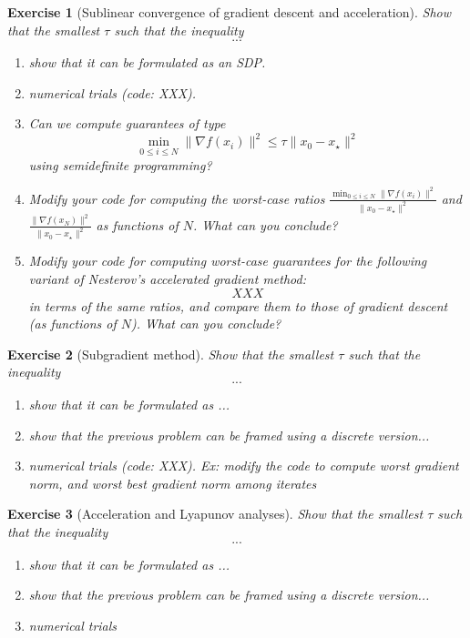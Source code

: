 \documentclass[11pt,a4paper]{article}
\newtheorem{exercise}{Exercise}
\begin{document}
	\begin{exercise}[Sublinear convergence of gradient descent and acceleration]
	Show that the smallest $\tau$ such that the inequality
	\[ ... \]
	\begin{enumerate}
	\item show that it can be formulated as an SDP.
	\item numerical trials (code: XXX).
	\item Can we compute guarantees of type 
	\[ \min_{0\leqslant i\leqslant N} \|\nabla f(x_i)\|^2\leqslant \tau \|x_0-x_\star\|^2\]
	using semidefinite programming?
	\item Modify your code for computing the worst-case ratios $\frac{\min_{0\leqslant i\leqslant N}\|\nabla f(x_i)\|^2}{\|x_0-x_\star\|^2}$ and $\frac{\|\nabla f(x_N)\|^2}{\|x_0-x_\star\|^2}$ as functions of $N$. What can you conclude?
	\item Modify your code for computing worst-case guarantees for the following variant of Nesterov's accelerated gradient method:
	\begin{equation*}
	XXX
	\end{equation*}
	in terms of the same ratios, and compare them to those of gradient descent (as functions of $N$). What can you conclude?
	\end{enumerate}
	\end{exercise}
	
\begin{exercise}[Subgradient method]
	Show that the smallest $\tau$ such that the inequality
	\[ ... \]
	\begin{enumerate}
	\item show that it can be formulated as ...
	\item show that the previous problem can be framed using a discrete version...
	\item numerical trials (code: XXX). Ex: modify the code to compute worst gradient norm, and worst best gradient norm among iterates
	\end{enumerate}
	\end{exercise}
	
	
	\begin{exercise}[Acceleration and Lyapunov analyses]
	Show that the smallest $\tau$ such that the inequality
	\[ ... \]
	\begin{enumerate}
	\item show that it can be formulated as ...
	\item show that the previous problem can be framed using a discrete version...
	\item numerical trials
	\end{enumerate}
	\end{exercise}
	
\end{document}
